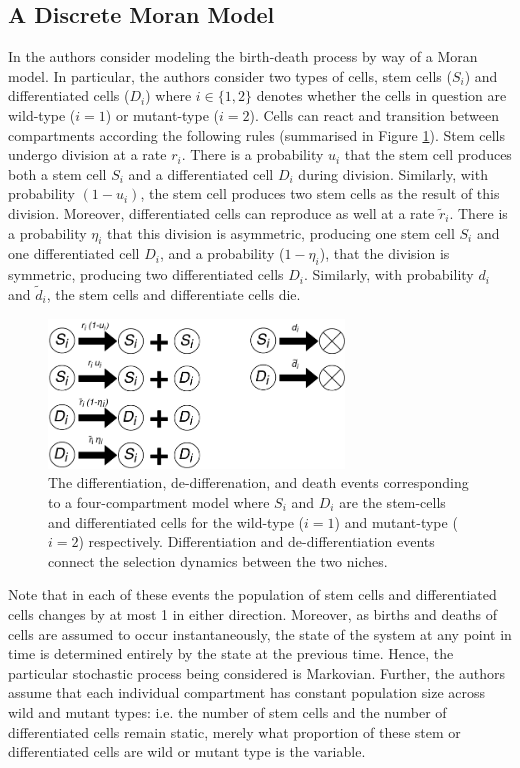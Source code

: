 \documentclass[12pt]{article}
\begin{document}
\subsection{A Discrete Moran Model}
In \cite{mohammad} the authors consider modeling the birth-death process by way of a Moran model. In particular, the authors consider two types of cells, stem cells ($S_i$) and differentiated cells ($D_i$) where $i\in\{1,2\}$ denotes whether the cells in question are wild-type ($i=1$) or mutant-type ($i=2$). Cells can react and transition between compartments according the following rules (summarised in Figure \ref{MohFig1}). Stem cells undergo division at a rate $r_i$. There is a probability $u_i$ that the stem cell produces both a stem cell $S_i$ and a differentiated cell $D_i$ during division. Similarly, with probability $(1-u_i)$, the stem cell produces two stem cells as the result of this division. Moreover, differentiated cells can reproduce as well at a rate $\tilde{r}_i$. There is a probability $\eta_i$ that this division is asymmetric, producing one stem cell $S_i$ and one differentiated cell $D_i$, and a probability ($1-\eta_i$), that the division is symmetric, producing two differentiated cells $D_i$. Similarly, with probability $d_i$ and $\tilde{d}_i$, the stem cells and differentiate cells die.

\begin{figure}[H]
\begin{center}
\includegraphics[width=0.7\textwidth]{Moh_Rxns.pdf}
\end{center}
\caption{The differentiation, de-differenation, and death events corresponding to a four-compartment model where $S_i$ and $D_i$ are the stem-cells and differentiated cells for the wild-type ($i=1$) and mutant-type ($i=2$) respectively. Differentiation and de-differentiation events connect the selection dynamics between the two niches.}\label{MohFig1}
\end{figure}

Note that in each of these events the population of stem cells and differentiated cells changes by at most 1 in either direction. Moreover, as births and deaths of cells are assumed to occur instantaneously, the state of the system at any point in time is determined entirely by the state at the previous time. Hence, the particular stochastic process being considered is Markovian. Further, the authors assume that each individual compartment has constant population size across wild and mutant types: i.e. the number of stem cells and the number of differentiated cells remain static, merely what proportion of these stem or differentiated cells are wild or mutant type is the variable.
\end{document}
